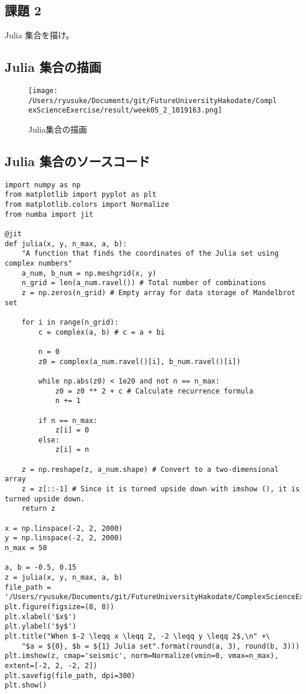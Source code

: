 \documentclass[dvipdfmx,uplatex]{jsarticle}
\begin{document}
\newpage

\subsection{課題 2}
  Julia 集合を描け。\\

\subsection{Julia 集合の描画}
  \begin{figure}[htbp]
  \begin{center}
  \texttt{[image: /Users/ryusuke/Documents/git/FutureUniversityHakodate/ComplexScienceExercise/result/week05\_2\_1019163.png]}
  \caption{Julia集合の描画}
  \end{center}
  \end{figure}

\newpage

\subsection{Julia 集合のソースコード}

\begin{lstlisting}[caption=Pythonによるジュリア集合の描画]
import numpy as np
from matplotlib import pyplot as plt
from matplotlib.colors import Normalize
from numba import jit

@jit
def julia(x, y, n_max, a, b):
    "A function that finds the coordinates of the Julia set using complex numbers"
    a_num, b_num = np.meshgrid(x, y)
    n_grid = len(a_num.ravel()) # Total number of combinations
    z = np.zeros(n_grid) # Empty array for data storage of Mandelbrot set

    for i in range(n_grid):
        c = complex(a, b) # c = a + bi

        n = 0
        z0 = complex(a_num.ravel()[i], b_num.ravel()[i])

        while np.abs(z0) < 1e20 and not n == n_max:
            z0 = z0 ** 2 + c # Calculate recurrence formula
            n += 1

        if n == n_max:
            z[i] = 0
        else:
            z[i] = n

    z = np.reshape(z, a_num.shape) # Convert to a two-dimensional array
    z = z[::-1] # Since it is turned upside down with imshow (), it is turned upside down.
    return z

x = np.linspace(-2, 2, 2000)
y = np.linspace(-2, 2, 2000)
n_max = 50

a, b = -0.5, 0.15
z = julia(x, y, n_max, a, b)
file_path = '/Users/ryusuke/Documents/git/FutureUniversityHakodate/ComplexScienceExercise/result/week05_2_1019163'
plt.figure(figsize=(8, 8))
plt.xlabel('$x$')
plt.ylabel('$y$')
plt.title("When $-2 \leqq x \leqq 2, -2 \leqq y \leqq 2$,\n" +\
    "$a = ${0}, $b = ${1} Julia set".format(round(a, 3), round(b, 3)))
plt.imshow(z, cmap='seismic', norm=Normalize(vmin=0, vmax=n_max), extent=[-2, 2, -2, 2])
plt.savefig(file_path, dpi=300)
plt.show()
\end{lstlisting}
\end{document}

